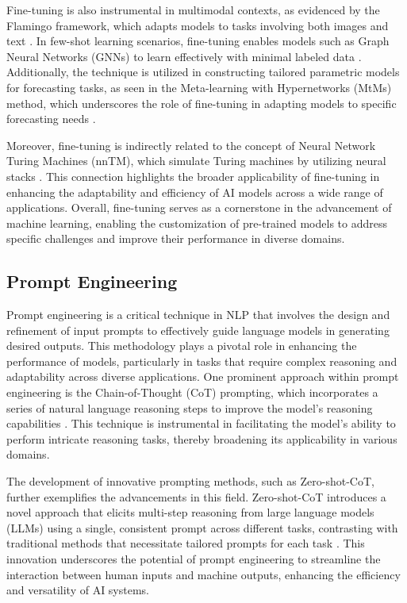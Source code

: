 Fine-tuning is also instrumental in multimodal contexts, as evidenced by the Flamingo framework, which adapts models to tasks involving both images and text \cite{alayrac2022flamingo}. In few-shot learning scenarios, fine-tuning enables models such as Graph Neural Networks (GNNs) to learn effectively with minimal labeled data \cite{ge2024psppretrainingstructureprompt}. Additionally, the technique is utilized in constructing tailored parametric models for forecasting tasks, as seen in the Meta-learning with Hypernetworks (MtMs) method, which underscores the role of fine-tuning in adapting models to specific forecasting needs \cite{stank2024designingtimeseriesmodelshypernetworks}.



Moreover, fine-tuning is indirectly related to the concept of Neural Network Turing Machines (nnTM), which simulate Turing machines by utilizing neural stacks \cite{stogin2022provablystableneuralnetwork}. This connection highlights the broader applicability of fine-tuning in enhancing the adaptability and efficiency of AI models across a wide range of applications. Overall, fine-tuning serves as a cornerstone in the advancement of machine learning, enabling the customization of pre-trained models to address specific challenges and improve their performance in diverse domains.



\subsection{Prompt Engineering} \label{subsec:Prompt Engineering}



Prompt engineering is a critical technique in NLP that involves the design and refinement of input prompts to effectively guide language models in generating desired outputs. This methodology plays a pivotal role in enhancing the performance of models, particularly in tasks that require complex reasoning and adaptability across diverse applications. One prominent approach within prompt engineering is the Chain-of-Thought (CoT) prompting, which incorporates a series of natural language reasoning steps to improve the model's reasoning capabilities \cite{wei2022chain}. This technique is instrumental in facilitating the model's ability to perform intricate reasoning tasks, thereby broadening its applicability in various domains.



The development of innovative prompting methods, such as Zero-shot-CoT, further exemplifies the advancements in this field. Zero-shot-CoT introduces a novel approach that elicits multi-step reasoning from large language models (LLMs) using a single, consistent prompt across different tasks, contrasting with traditional methods that necessitate tailored prompts for each task \cite{kojima2022large}. This innovation underscores the potential of prompt engineering to streamline the interaction between human inputs and machine outputs, enhancing the efficiency and versatility of AI systems.



